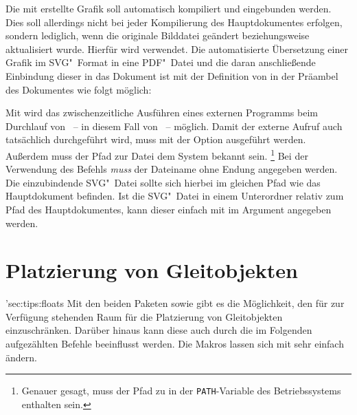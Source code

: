 Die mit  erstellte Grafik soll automatisch kompiliert und 
eingebunden werden. Dies soll allerdings nicht bei jeder Kompilierung des 
Hauptdokumentes erfolgen, sondern lediglich, wenn die originale Bilddatei 
geändert beziehungsweise aktualisiert wurde. Hierfür wird  
verwendet. Die automatisierte Übersetzung einer Grafik im SVG"~Format in eine 
PDF"~Datei und die daran anschließende Einbindung dieser in das Dokument ist 
mit der Definition von  
in der Präambel des Dokumentes wie folgt möglich:
%
%
\begin{quoting}
\end{quoting}
%
Mit  wird das 
zwischenzeitliche Ausführen eines externen Programms beim Durchlauf von 
~-- in diesem Fall von ~-- möglich. Damit 
der externe Aufruf auch tatsächlich durchgeführt wird, muss  
mit der Option  ausgeführt werden. Außerdem muss der 
Pfad zur Datei  dem System bekannt sein.%
\footnote{%
  Genauer gesagt, muss der Pfad zu  in der 
  \texttt{PATH}-Variable des Betriebssystems enthalten sein.
}
Bei der Verwendung des Befehls  \emph{muss} der Dateiname 
ohne Endung angegeben werden. Die einzubindende SVG"~Datei sollte sich hierbei 
im gleichen Pfad wie das Hauptdokument befinden. Ist die SVG"~Datei in einem 
Unterordner relativ zum Pfad des Hauptdokumentes, kann dieser einfach mit 
 im Argument 
angegeben werden.



\section{Platzierung von Gleitobjekten}
\manualhyperdef'{sec:tips:floats}{}%
%
%
Mit den beiden Paketen  sowie  gibt es die 
Möglichkeit, den für  zur Verfügung stehenden Raum für die 
Platzierung von Gleitobjekten einzuschränken. Darüber hinaus kann diese auch 
durch die im Folgenden aufgezählten Befehle beeinflusst werden. Die Makros 
lassen sich mit  sehr 
einfach ändern.

